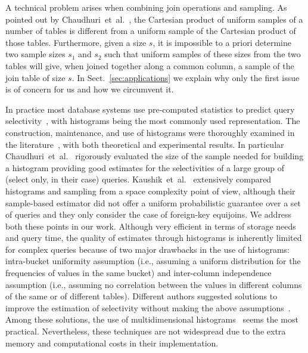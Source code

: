 A technical problem arises when combining join operations and sampling. As
pointed out by Chaudhuri~et~al.~\citeyearpar{ChaudhuriMN99}, the Cartesian
product of uniform samples of a number of tables is different from a uniform sample of the
Cartesian product of those tables. Furthermore, given a size $s$, it is
impossible to a priori determine two sample sizes $s_1$ and $s_2$ such that
uniform samples of these sizes from the two tables will give, when joined
together along a common column, a sample of the join table of size $s$. In
Sect.~\ref{sec:applications} we explain why only the first issue is of concern
for us and how we circumvent it.

In practice most database systems use pre-computed statistics to predict query
selectivity~\citep{HouOT88,GibbonsM98,GantiLR00,JinGJA06,LarsonLZZ07}, with
histograms being the most commonly used representation. The construction,
maintenance, and use of histograms were thoroughly examined in the
literature~\citep{JagadishKMPSS98,IoannidisP95,MatiasVW98,PoosalaHIS96}, with
both theoretical and experimental results. In particular
Chaudhuri~et~al.~\citeyearpar{ChaudhuriMN98} rigorously evaluated the size of the
sample needed for
building a histogram providing good estimates for the selectivities of a large
group of (select only, in their case) queries.
Kaushik~et~al.~\citeyearpar{KaushikNRC05} extensively compared histograms and sampling
from a
space complexity point of view, although their sample-based estimator did not
offer a uniform probabilistic guarantee over a set of queries and they only
consider the case of foreign-key equijoins. We address both these points in our
work. Although very efficient in terms of storage needs and query time, the
quality of estimates through histograms is inherently limited for complex
queries because of two major drawbacks in the use of histograms: intra-bucket
uniformity assumption (i.e., assuming a uniform distribution for the frequencies
of values in the same bucket) and inter-column independence assumption (i.e.,
assuming no correlation between the values in different columns of the same or
of different tables).  Different authors suggested solutions to improve the
estimation of selectivity without making the above
assumptions~\citep{BrunoC04,Dobra05,PoosalaI97,WangVI97,WangS03}. Among these
solutions, the use of multidimensional
histograms~\citep{BrunoCG01,PoosalaI97,SrivastavaHMKT,WangS03} seems the most
practical. Nevertheless, these techniques are not widespread due to the extra
memory and computational costs in their implementation.

